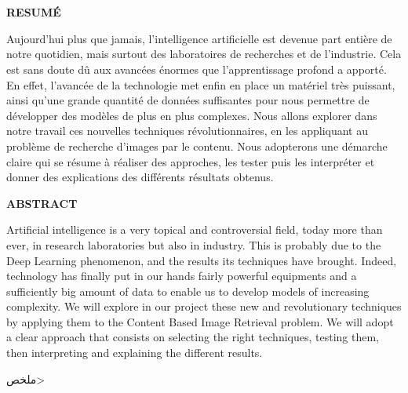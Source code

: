 
\chapter*{}%


\begin{center}
\begin{Huge}
\textbf{RESUMÉ}\\

\end{Huge}
\end{center}

	Aujourd'hui plus que jamais, l'intelligence artificielle est devenue part entière de notre quotidien, mais surtout des laboratoires de recherches et de l'industrie. Cela est sans doute dû aux avancées énormes que l'apprentissage profond a apporté. En effet, l'avancée de la technologie met enfin en place un matériel très puissant, ainsi qu'une grande quantité de données suffisantes pour nous permettre de développer des modèles de plus en plus complexes. Nous allons explorer dans notre travail ces nouvelles techniques révolutionnaires, en les appliquant au problème de recherche d'images par le contenu. Nous adopterons une démarche claire qui se résume à réaliser des approches, les tester puis les interpréter et donner des explications des différents résultats obtenus.\\

\begin{center}
\begin{Huge}
\textbf{ABSTRACT}
\end{Huge}
\end{center}

	Artificial intelligence is a very topical and controversial field, today more than ever, in research laboratories but also in industry. This is probably due to the Deep Learning phenomenon, and the results its techniques have brought. Indeed, technology has finally put in our hands fairly powerful equipments and a sufficiently big amount of data to enable us to develop models of increasing complexity. We will explore in our project these new and revolutionary techniques by applying them to the Content Based Image Retrieval problem. We will adopt a clear approach that consists on selecting the right techniques, testing them, then interpreting and explaining the different results.\\


\begin{center}
\begin{Huge}
\<ملخص>\\
\end{Huge}
\end{center}

